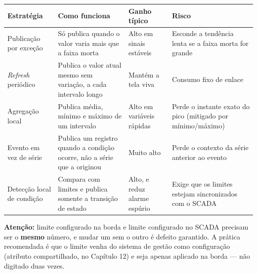 \begin{longtable}[]{@{}
  >{\raggedright\arraybackslash}p{}
  >{\raggedright\arraybackslash}p{}
  >{\raggedright\arraybackslash}p{}
  >{\raggedright\arraybackslash}p{}@{}}
\toprule\noalign{}
\begin{minipage}[b]{\linewidth}\raggedright
Estratégia
\end{minipage} & \begin{minipage}[b]{\linewidth}\raggedright
Como funciona
\end{minipage} & \begin{minipage}[b]{\linewidth}\raggedright
Ganho típico
\end{minipage} & \begin{minipage}[b]{\linewidth}\raggedright
Risco
\end{minipage} \\
\midrule\noalign{}
\endhead
\bottomrule\noalign{}
\endlastfoot
Publicação por exceção & Só publica quando o valor varia mais que a faixa morta & Alto em sinais estáveis & Esconde a tendência lenta se a faixa morta for grande \\
\emph{Refresh} periódico & Publica o valor atual mesmo sem variação, a cada intervalo longo & Mantém a tela viva & Consumo fixo de enlace \\
Agregação local & Publica média, mínimo e máximo de um intervalo & Alto em variáveis rápidas & Perde o instante exato do pico (mitigado por mínimo/máximo) \\
Evento em vez de série & Publica um registro quando a condição ocorre, não a série que a originou & Muito alto & Perde o contexto da série anterior ao evento \\
Detecção local de condição & Compara com limites e publica somente a transição de estado & Alto, e reduz alarme espúrio & Exige que os limites estejam sincronizados com o SCADA \\
\end{longtable}

\begin{caixaatencao}

\textbf{Atenção:} limite configurado na borda e limite configurado no SCADA precisam ser o \textbf{mesmo}
número, e mudar um sem o outro é defeito garantido. A prática recomendada é que o limite venha do
sistema de gestão como configuração (atributo compartilhado, no Capítulo 12) e seja apenas
aplicado na borda --- não digitado duas vezes.

\end{caixaatencao}

